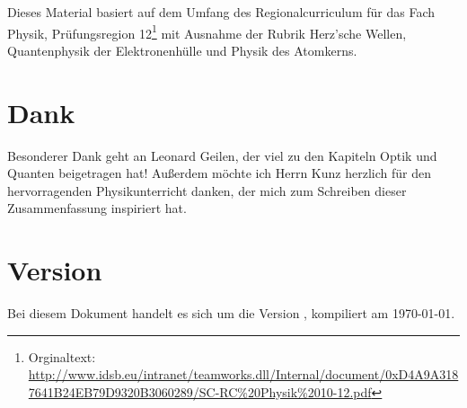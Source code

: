 Dieses Material basiert auf dem Umfang des \glqq Regionalcurriculum für das Fach Physik, Prüfungsregion 12\grqq{}\footnote{Orginaltext: \url{http://www.idsb.eu/intranet/teamworks.dll/Internal/document/0xD4A9A3187641B24EB79D9320B3060289/SC-RC\%20Physik\%2010-12.pdf}} mit Ausnahme der Rubrik \glqq Herz'sche Wellen\grqq , \glqq Quantenphysik der Elektronenhülle\grqq{} und \glqq Physik des Atomkerns\grqq .


\section*{Dank}

Besonderer Dank geht an Leonard Geilen, der viel zu den Kapiteln Optik und Quanten beigetragen hat! Außerdem möchte ich Herrn Kunz herzlich für den hervorragenden Physikunterricht danken, der mich zum Schreiben dieser Zusammenfassung inspiriert hat. 


\section*{Version}

Bei diesem Dokument handelt es sich um die Version \version , kompiliert am \today .
